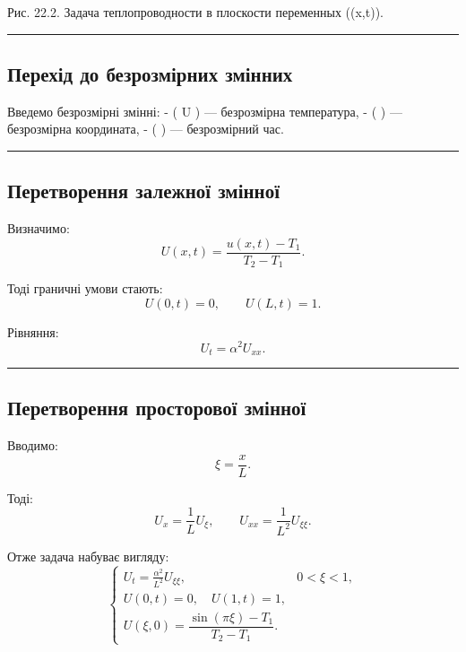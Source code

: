 \documentclass[
  ukrainian,
]{article}
\begin{document}
Рис. 22.2. Задача теплопроводности в плоскости переменных ((x,t)).

\begin{center}\rule{0.5\linewidth}{0.5pt}\end{center}

\subsection{Перехід до безрозмірних
змінних}\label{ux43fux435ux440ux435ux445ux456ux434-ux434ux43e-ux431ux435ux437ux440ux43eux437ux43cux456ux440ux43dux438ux445-ux437ux43cux456ux43dux43dux438ux445-1}

Введемо безрозмірні змінні: - ( U ) --- безрозмірна температура, - (
\xi ) --- безрозмірна координата, - ( \tau ) --- безрозмірний час.

\begin{center}\rule{0.5\linewidth}{0.5pt}\end{center}

\subsection{Перетворення залежної
змінної}\label{ux43fux435ux440ux435ux442ux432ux43eux440ux435ux43dux43dux44f-ux437ux430ux43bux435ux436ux43dux43eux457-ux437ux43cux456ux43dux43dux43eux457}

Визначимо: \[
U(x,t) = \frac{u(x,t) - T_1}{T_2 - T_1}.
\]

Тоді граничні умови стають: \[
U(0,t)=0, \qquad U(L,t)=1.
\]

Рівняння: \[
U_t = \alpha^2 U_{xx}.
\]

\begin{center}\rule{0.5\linewidth}{0.5pt}\end{center}

\subsection{Перетворення просторової
змінної}\label{ux43fux435ux440ux435ux442ux432ux43eux440ux435ux43dux43dux44f-ux43fux440ux43eux441ux442ux43eux440ux43eux432ux43eux457-ux437ux43cux456ux43dux43dux43eux457}

Вводимо: \[
\xi = \frac{x}{L}.
\]

Тоді: \[
U_x = \frac{1}{L} U_\xi, \qquad U_{xx} = \frac{1}{L^2} U_{\xi\xi}.
\]

Отже задача набуває вигляду: \[
\begin{cases}
U_t = \frac{\alpha^2}{L^2} U_{\xi\xi}, & 0 < \xi < 1, \\
U(0,t)=0,\quad U(1,t)=1, \\
U(\xi,0)=\dfrac{\sin(\pi \xi)-T_1}{T_2-T_1}.
\end{cases}
\]
\end{document}
